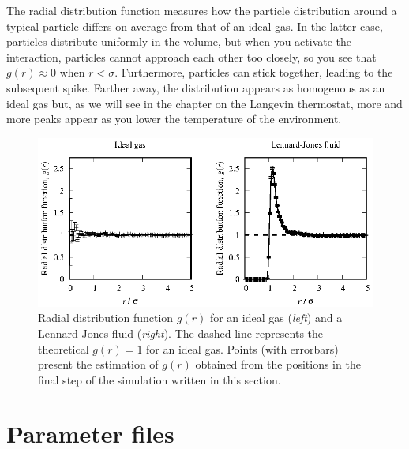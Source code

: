 The radial distribution function measures how the particle distribution around a
typical particle differs on average from that of an ideal gas. In the latter
case, particles distribute uniformly in the volume, but when you activate the
interaction, particles cannot approach each other too closely, so you see that
$g(r) \approx 0$ when $r < \sigma$. Furthermore, particles can stick together,
leading to the subsequent spike. Farther away, the distribution appears as
homogenous as an ideal gas but, as we will see in the chapter on the Langevin
thermostat, more and more peaks appear as you lower the temperature of the
environment.

\begin{figure}
  \includegraphics[width = \textwidth]{figures/Lennard-Jones.rdf.eps}
  \caption{\label{Lennard-Jones.rdf}Radial distribution function $g(r)$ for an
           ideal gas (\textit{left}) and a Lennard-Jones fluid (\textit{right}).
           The dashed line represents the theoretical $g(r) = 1$ for an ideal
           gas. Points (with errorbars) present the estimation of $g(r)$
           obtained from the positions in the final step of the simulation
           written in this section.}
\end{figure}

\section{\label{Parameter_files}Parameter files}

